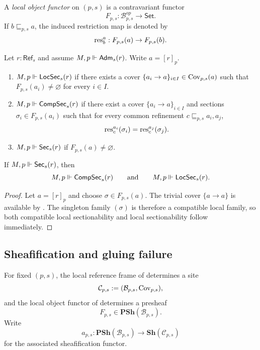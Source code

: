 \begin{definition}\label{def:local-object-functor}
A \emph{local object functor} on $(p,s)$ is a contravariant functor
\[
F_{p,s}:\mathcal{B}_{p,s}^{op}\to\mathsf{Set}.
\]
If $b\sqsubseteq_{p,s} a$, the induced restriction map is denoted by
\[
\mathrm{res}_b^a:F_{p,s}(a)\to F_{p,s}(b).
\]
\end{definition}

\begin{definition}\label{def:existence-levels}
Let $r:\mathsf{Ref}_s$ and assume $M,p\Vdash \mathsf{Adm}_s(r)$. Write $a=[r]_p$.
\begin{enumerate}[label=(\roman*),nosep]
\item $M,p\Vdash \mathsf{LocSec}_s(r)$ if there exists a cover $\{a_i\to a\}_{i\in I}\in\mathrm{Cov}_{p,s}(a)$ such that $F_{p,s}(a_i)\neq\varnothing$ for every $i\in I$.
\item $M,p\Vdash \mathsf{CompSec}_s(r)$ if there exist a cover $\{a_i\to a\}_{i\in I}$ and sections $\sigma_i\in F_{p,s}(a_i)$ such that for every common refinement $c\sqsubseteq_{p,s} a_i,a_j$,
\[
\mathrm{res}_c^{a_i}(\sigma_i)=\mathrm{res}_c^{a_j}(\sigma_j).
\]
\item $M,p\Vdash \mathsf{Sec}_s(r)$ if $F_{p,s}(a)\neq\varnothing$.
\end{enumerate}
\end{definition}

\begin{proposition}\label{prop:global-implies-compatible-local}
If $M,p\Vdash \mathsf{Sec}_s(r)$, then
\[
M,p\Vdash \mathsf{CompSec}_s(r)
\qquad\text{and}\qquad
M,p\Vdash \mathsf{LocSec}_s(r).
\]
\end{proposition}

\begin{proof}
Let $a=[r]_p$ and choose $\sigma\in F_{p,s}(a)$. The trivial cover $\{a\to a\}$ is available by . The singleton family $(\sigma)$ is therefore a compatible local family, so both compatible local sectionability and local sectionability follow immediately.
\end{proof}

\subsection{Sheafification and gluing failure}

For fixed $(p,s)$, the local reference frame of  determines a site
\[
\mathcal{C}_{p,s}:=(\mathcal{B}_{p,s},\mathrm{Cov}_{p,s}),
\]
and the local object functor of  determines a presheaf
\[
F_{p,s}\in\mathbf{PSh}(\mathcal{B}_{p,s}).
\]
Write
\[
a_{p,s}:\mathbf{PSh}(\mathcal{B}_{p,s})\to\mathbf{Sh}(\mathcal{C}_{p,s})
\]
for the associated sheafification functor.

